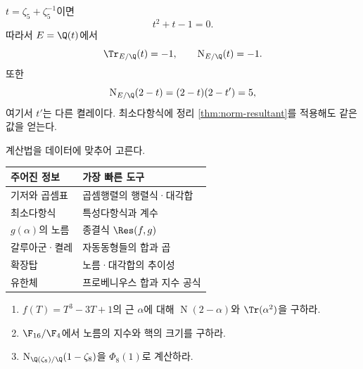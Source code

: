 \begin{example}[최대 실부분체]
$t=\zeta_5+\zeta_5^{-1}$이면
\[
  t^2+t-1=0.
\]
따라서 $E=\Q(t)$에서
\[
  \Tr_{E/\Q}(t)=-1,
  \qquad
  \operatorname N_{E/\Q}(t)=-1.
\]
또한
\[
  \operatorname N_{E/\Q}(2-t)
  =(2-t)(2-t')=5,
\]
여기서 $t'$는 다른 켤레이다. 최소다항식에 정리 \ref{thm:norm-resultant}를 적용해도 같은 값을 얻는다.
\end{example}

\begin{keyidea}
계산법을 데이터에 맞추어 고른다.
\begin{center}
\renewcommand{\arraystretch}{1.25}
\begin{tabular}{ll}
\toprule
주어진 정보 & 가장 빠른 도구 \\
\midrule
기저와 곱셈표 & 곱셈행렬의 행렬식·대각합 \\
최소다항식 & 특성다항식과 계수 \\
$g(\alpha)$의 노름 & 종결식 $\Res(f,g)$ \\
갈루아군·켤레 & 자동동형들의 합과 곱 \\
확장탑 & 노름·대각합의 추이성 \\
유한체 & 프로베니우스 합과 지수 공식 \\
\bottomrule
\end{tabular}
\end{center}
\end{keyidea}

\begin{checkpoint}
\begin{enumerate}[label=(\alph*)]
  \item $f(T)=T^3-3T+1$의 근 $\alpha$에 대해 $\operatorname N(2-\alpha)$와 $\Tr(\alpha^2)$을 구하라.
  \item $\F_{16}/\F_4$에서 노름의 지수와 핵의 크기를 구하라.
  \item $\operatorname N_{\Q(\zeta_8)/\Q}(1-\zeta_8)$을 $\Phi_8(1)$로 계산하라.
\end{enumerate}
\end{checkpoint}
